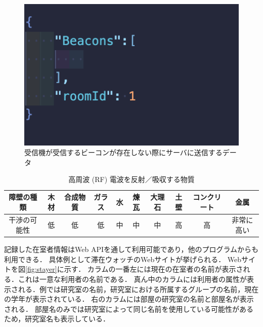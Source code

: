 \begin{figure}[H]
  \begin{center}
    \includegraphics[width=15cm]{image/rasPost0.png}
    \caption{受信機が受信するビーコンが存在しない際にサーバに送信するデータ}
    \label{fig:rasPost0}
  \end{center}
\end{figure}





\begin{table}[H]
  \begin{center}
    \caption{高周波 (RF) 電波を反射／吸収する物質}
    \label{tb:rf}
    \begin{tabular}{|c||c|c|c|c|c|c|c|c|c|} \hline
      障壁の種類  & 木材 & 合成物質 & ガラス & 水 & 煉瓦 & 大理石 & 土壁 & コンクリート & 金属    \\ \hline
      干渉の可能性 & 低  & 低    & 低   & 中 & 中  & 中   & 高  & 高      & 非常に高い \\ \hline
    \end{tabular}
  \end{center}
\end{table}

記録した在室者情報はWeb APIを通して利用可能であり，他のプログラムからも利用できる．
具体例として滞在ウォッチのWebサイトが挙げられる．
Webサイトを図\ref{fig:stayer}に示す．
カラムの一番左には現在の在室者の名前が表示される．これは一意な利用者の名前である．
真ん中のカラムには利用者の属性が表示される．例では研究室の名前，研究室における所属するグループの名前，現在の学年が表示されている．
右のカラムには部屋の研究室の名前と部屋名が表示される．
部屋名のみでは研究室によって同じ名前を使用している可能性があるため，研究室名も表示している．





